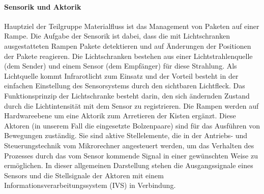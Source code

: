 \paragraph{ Sensorik und Aktorik}
Hauptziel der Teilgruppe Materialfluss ist das Management von Paketen auf einer Rampe.
Die Aufgabe der Sensorik ist dabei, dass die mit Lichtschranken ausgestatteten Rampen Pakete detektieren und auf \"Anderungen der Positionen der Pakete reagieren.
Die Lichtschranken bestehen aus einer Lichtstrahlenquelle (dem Sender) und einem Sensor (dem Empf\"anger) f\"{u}r diese Strahlung.
Als Lichtquelle kommt Infrarotlicht zum Einsatz und der Vorteil besteht in der einfachen Einstellung des Sensorsystems durch den
sichtbaren Lichtfleck. Das Funktionsprinzip der Lichtschranke besteht darin, den sich  \"andernden Zustand durch die Lichtintensit\"at mit dem Sensor zu registrieren. 
Die Rampen werden auf Hardwareebene um eine Aktorik zum Arretieren der Kisten erg\"anzt. Diese Aktoren (in unserem Fall die
eingesetzte Bolzenpaare) sind f\"ur das Ausf\"uhren von Bewegungen zust\"andig.
Sie sind aktive Stellelemente, die in der Antriebs- und Steuerungstechnik vom  Mikrorechner angesteuert werden, um das Verhalten des Prozesses durch das vom Sensor kommende Signal in einer gew\"{u}nschten Weise zu erm\"oglichen. In dieser allgemeinen Darstellung stehen die 
Ausgangssignale eines Sensors und die Stellsignale der Aktoren mit einem
Informationsverarbeitungssystem (IVS) in Verbindung.